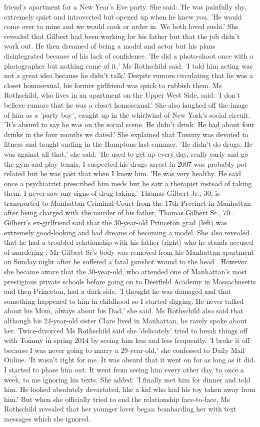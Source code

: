 \begin{table}[H]
friend’s apartment for a New Year’s Eve party. She said: 'He was painfully shy, extremely quiet and introverted but opened up when he knew you. 'He would come over to mine and we would cook or order in. We both loved sushi.' She revealed that Gilbert had been working for his father but that the job didn't work out. He then dreamed of being a model and actor but his plans disintegrated because of his lack of confidence. 'He did a photo-shoot once with a photographer but nothing came of it,' Ms Rothschild said. 'I told him acting was not a great idea because he didn’t talk.' Despite rumors circulating that he was a closet homosexual, his former girlfriend was quick to rubbish them. Ms Rothschild, who lives in an apartment on the Upper West Side, said: 'I don’t believe rumors that he was a closet homosexual.' She also laughed off the image of him as a 'party boy', caught up in the whirlwind of New York's social circuit. 'It’s absurd to say he was on the social scene. He didn’t drink. He had about four drinks in the four months we dated.' She explained that Tommy was devoted to fitness and taught surfing in the Hamptons last summer. 'He didn’t do drugs. He was against all that,' she said. 'He used to get up every day, really early and go the gym and play tennis. I suspected his drugs arrest in 2007 was probably pot-related but he was past that when I knew him. 'He was very healthy. He said once a psychiatrist prescribed him meds but he saw a therapist instead of taking them. I never saw any signs of drug taking.' Thomas Gilbert Jr., 30, is transported to Manhattan Criminal Court from the 17th Precinct in Manhattan after being charged with the murder of his father, Thomas Gilbert Sr., 70 . Gilbert's ex-girlfriend said that the 30-year-old Princeton grad (left) was extremely good-looking and had dreams of becoming a model. She also revealed that he had a troubled relationship with his father (right) who he stands accused of murdering . Mr Gilbert Sr's body was removed from his Manhattan apartment on Sunday night after he suffered a fatal gunshot wound to the head . However she became aware that the 30-year-old, who attended one of Manhattan's most prestigious private schools before going on to Deerfield Academy in Massachusetts and then Princeton, had a dark side. 'I thought he was damaged and that something happened to him in childhood so I started digging. He never talked about his Mom, always about his Dad,' she said. Ms Rothschild also said that although his 24-year-old sister Clare lived in Manhattan, he rarely spoke about her. Twice-divorced Ms Rothschild said she 'delicately' tried to break things off with Tommy in spring 2014 by seeing him less and less frequently. 'I broke it off because I was never going to marry a 29-year-old,' she confessed to Daily Mail Online. 'It wasn’t right for me. It was absurd that it went on for as long as it did. I started to phase him out. It went from seeing him every other day, to once a week, to me ignoring his texts. She added: 'I finally met him for dinner and told him. He looked absolutely devastated, like a kid who had his toy taken away from him.' But when she officially tried to end the relationship face-to-face, Ms Rothschild revealed that her younger lover began bombarding her with text messages which she ignored. 
\end{table}
